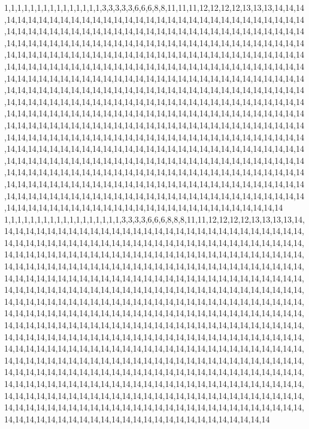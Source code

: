 1,1,1,1,1,1,1,1,1,1,1,1,1,1,1,3,3,3,3,3,6,6,6,8,8,11,11,11,12,12,12,12,13,13,13,14,14,14,14,14,14,14,14,14,14,14,14,14,14,14,14,14,14,14,14,14,14,14,14,14,14,14,14,14,14,14,14,14,14,14,14,14,14,14,14,14,14,14,14,14,14,14,14,14,14,14,14,14,14,14,14,14,14,14,14,14,14,14,14,14,14,14,14,14,14,14,14,14,14,14,14,14,14,14,14,14,14,14,14,14,14,14,14,14,14,14,14,14,14,14,14,14,14,14,14,14,14,14,14,14,14,14,14,14,14,14,14,14,14,14,14,14,14,14,14,14,14,14,14,14,14,14,14,14,14,14,14,14,14,14,14,14,14,14,14,14,14,14,14,14,14,14,14,14,14,14,14,14,14,14,14,14,14,14,14,14,14,14,14,14,14,14,14,14,14,14,14,14,14,14,14,14,14,14,14,14,14,14,14,14,14,14,14,14,14,14,14,14,14,14,14,14,14,14,14,14,14,14,14,14,14,14,14,14,14,14,14,14,14,14,14,14,14,14,14,14,14,14,14,14,14,14,14,14,14,14,14,14,14,14,14,14,14,14,14,14,14,14,14,14,14,14,14,14,14,14,14,14,14,14,14,14,14,14,14,14,14,14,14,14,14,14,14,14,14,14,14,14,14,14,14,14,14,14,14,14,14,14,14,14,14,14,14,14,14,14,14,14,14,14,14,14,14,14,14,14,14,14,14,14,14,14,14,14,14,14,14,14,14,14,14,14,14,14,14,14,14,14,14,14,14,14,14,14,14,14,14,14,14,14,14,14,14,14,14,14,14,14,14,14,14,14,14,14,14,14,14,14,14,14,14,14,14,14,14,14,14,14,14,14,14,14,14,14,14,14,14,14,14,14,14,14,14,14,14,14,14,14,14,14,14,14,14,14,14,14,14,14,14,14,14,14,14,14,14,14,14,14,14,14,14,14,14,14,14,14,14,14,14,14,14,14,14,14,14,14,14,14,14,14,14,14,14,14,14,14,14,14,14,14,14,14,14,14,14,14,14,14,14,14,14,14,14,14,14,14,14,14,14,14,14,14,14,14,14,14,14,14,14,14,14,14,14,14,14,14,14,14,14,14,14,14
1,1,1,1,1,1,1,1,1,1,1,1,1,1,1,1,1,1,3,3,3,3,6,6,6,8,8,8,11,11,12,12,12,12,13,13,13,13,14,14,14,14,14,14,14,14,14,14,14,14,14,14,14,14,14,14,14,14,14,14,14,14,14,14,14,14,14,14,14,14,14,14,14,14,14,14,14,14,14,14,14,14,14,14,14,14,14,14,14,14,14,14,14,14,14,14,14,14,14,14,14,14,14,14,14,14,14,14,14,14,14,14,14,14,14,14,14,14,14,14,14,14,14,14,14,14,14,14,14,14,14,14,14,14,14,14,14,14,14,14,14,14,14,14,14,14,14,14,14,14,14,14,14,14,14,14,14,14,14,14,14,14,14,14,14,14,14,14,14,14,14,14,14,14,14,14,14,14,14,14,14,14,14,14,14,14,14,14,14,14,14,14,14,14,14,14,14,14,14,14,14,14,14,14,14,14,14,14,14,14,14,14,14,14,14,14,14,14,14,14,14,14,14,14,14,14,14,14,14,14,14,14,14,14,14,14,14,14,14,14,14,14,14,14,14,14,14,14,14,14,14,14,14,14,14,14,14,14,14,14,14,14,14,14,14,14,14,14,14,14,14,14,14,14,14,14,14,14,14,14,14,14,14,14,14,14,14,14,14,14,14,14,14,14,14,14,14,14,14,14,14,14,14,14,14,14,14,14,14,14,14,14,14,14,14,14,14,14,14,14,14,14,14,14,14,14,14,14,14,14,14,14,14,14,14,14,14,14,14,14,14,14,14,14,14,14,14,14,14,14,14,14,14,14,14,14,14,14,14,14,14,14,14,14,14,14,14,14,14,14,14,14,14,14,14,14,14,14,14,14,14,14,14,14,14,14,14,14,14,14,14,14,14,14,14,14,14,14,14,14,14,14,14,14,14,14,14,14,14,14,14,14,14,14,14,14,14,14,14,14,14,14,14,14,14,14,14,14,14,14,14,14,14,14,14,14,14,14,14,14,14,14,14,14,14,14,14,14,14,14,14,14,14,14,14,14,14,14,14,14,14,14,14,14,14,14,14,14,14,14,14,14,14,14,14,14,14,14,14,14,14,14,14,14,14,14,14,14,14,14,14,14,14,14,14,14,14,14,14,14,14,14,14,14,14,14,14,14,14,14,14,14
